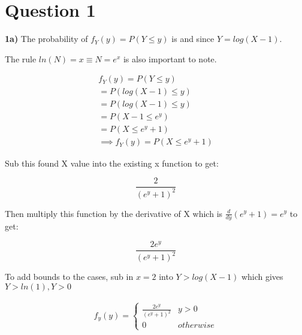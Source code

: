 \documentclass[oneside, a4paper]{article}
\begin{document}


\pagestyle{fancy}
\fancyhf{}

\newpage

\setcounter{secnumdepth}{-1}
\section{Question 1}

\textbf{1a)} The probability of $f_Y(y) = P(Y \leq y)$ is and since $Y = log(X - 1)$. 

The rule $ln(N) = x \equiv N = e^x$ is also important to note.

\begin{equation}
\begin{split}
f_Y(y) = P(Y\leq y) \\
= P(log(X-1)\leq y) \\
= P(log(X-1)\leq y) \\
= P(X - 1\leq e^y) \\
= P(X \leq e^y + 1) \\
\implies 
f_Y(y) = P(X \leq e^y + 1)
\end{split}
\end{equation}

Sub this found X value into the existing x function to get:

$$\frac{2}{(e^y + 1)^2}$$

Then multiply this function by the derivative of X which is $\frac{d}{dy} (e^y + 1) = e^y$ to get:

$$\frac{2e^y}{(e^y + 1)^2}$$

To add bounds to the cases, sub in $x = 2$ into $Y > log(X - 1)$ which gives $Y > ln(1), Y > 0$

\begin{equation}
\begin{split}
    f_y(y) = \begin{cases} 
        \frac{2e^y}{(e^y + 1)^2} & y > 0 \\ 
        0 & otherwise
    \end{cases}
\end{split}
\end{equation}
\end{document}
